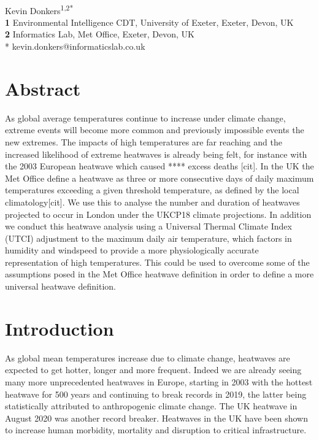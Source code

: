\documentclass[10pt,letterpaper]{article}
\begin{document}
\vspace*{0.2in}

\begin{flushleft}
{\Large
\textbf{}}
\newline
\\
Kevin Donkers\textsuperscript{1,2*}
\\
\bigskip
\textbf{1} Environmental Intelligence CDT, University of Exeter, Exeter, Devon, UK
\\
\textbf{2} Informatics Lab, Met Office, Exeter, Devon, UK
\\
\bigskip
* kevin.donkers@informaticslab.co.uk
\end{flushleft}


\section*{Abstract}

As global average temperatures continue to increase under climate change, extreme events will become more common and previously impossible events the new extremes. The impacts of high temperatures are far reaching and the increased likelihood of extreme heatwaves is already being felt, for instance with the 2003 European heatwave which caused **** excess deaths [cit]. In the UK the Met Office define a heatwave as three or more consecutive days of daily maximum temperatures exceeding a given threshold temperature, as defined by the local climatology[cit]. We use this to analyse the number and duration of heatwaves projected to occur in London under the UKCP18 climate projections. In addition we conduct this heatwave analysis using a Universal Thermal Climate Index (UTCI) adjustment to the maximum daily air temperature, which factors in humidity and windspeed to provide a more physiologically accurate representation of high temperatures. This could be used to overcome some of the assumptions posed in the Met Office heatwave definition in order to define a more universal heatwave definition.

\section*{Introduction}

As global mean temperatures increase due to climate change, heatwaves are expected to get hotter, longer and more frequent. 
Indeed we are already seeing many more unprecedented heatwaves in Europe, starting in 2003 with the hottest heatwave for 500 years\cite{Stott2004} and continuing to break records in 2019, the latter being statistically attributed to anthropogenic climate change.\cite{Vautard2020} 
The UK heatwave in August 2020 was another record breaker.\cite{Askew2020}
Heatwaves in the UK have been shown to increase human morbidity\cite{Smith2016}, mortality\cite{Johnson2004} and disruption to critical infrastructure.\cite{Dawson2016}
\end{document}
